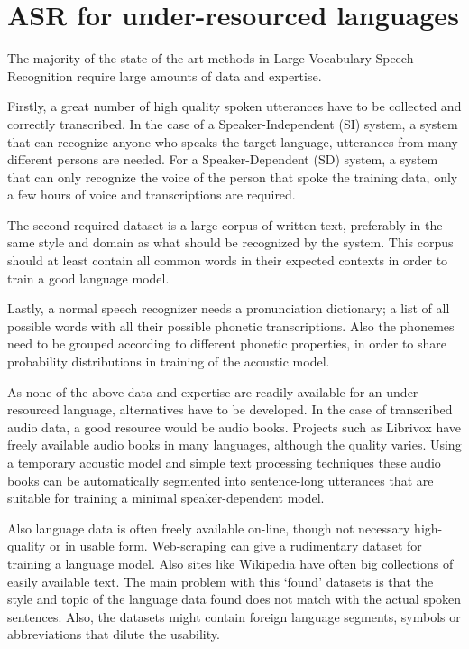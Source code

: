 \documentclass[b5paper]{article}
\begin{document}
\section{ASR for under-resourced languages}
The majority of the state-of-the art methods in Large Vocabulary Speech Recognition require large amounts of data and expertise. 

Firstly, a great number of high quality spoken utterances have to be collected and correctly transcribed. In the case of  a Speaker-Independent (SI) system, a system that can recognize anyone who speaks the target language, utterances from many different persons are needed. For a Speaker-Dependent (SD) system, a system that can only recognize the voice of the person that spoke the training data, only a few hours of voice and transcriptions are required.

The second required dataset is a large corpus of written text, preferably in the same style and domain as what should be recognized by the system. This corpus should at least contain all common words in their expected contexts in order to train a good language model.

Lastly, a normal speech recognizer needs a pronunciation dictionary; a list of all possible words with all their possible phonetic transcriptions. Also the phonemes need to be grouped according to different phonetic properties, in order to share probability distributions in  training of the acoustic model.

As none of the above data and expertise are readily available for an under-resourced language, alternatives have to be developed. In the case of transcribed audio data, a good resource would be audio books. Projects such as Librivox have freely available audio books in many languages, although the quality varies. Using a temporary acoustic model and simple text processing techniques these audio books can be automatically segmented into sentence-long utterances that are suitable for training a minimal speaker-dependent model.

Also language data is often freely available on-line, though not necessary high-quality or in usable form. Web-scraping \cite{scannell2007crubadan} can give a rudimentary dataset for training a language model. Also sites like Wikipedia have often big collections of easily available text. The main problem with this `found' datasets is that the style and topic of the language data found does not match with the actual spoken sentences. Also, the datasets might contain foreign language segments, symbols or abbreviations that dilute the usability.
\end{document}
